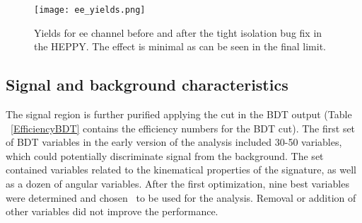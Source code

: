 




\begin{figure}[tbp]
  \begin{center}
    \texttt{[image: ee\_yields.png]}
    \caption{Yields for ee channel before and after the tight isolation bug fix in the HEPPY. The effect is minimal as can be seen in the final limit. }
    \label{fig:yields_ee}
  \end{center}
\end{figure}



\subsection{Signal and background characteristics}

The signal region is further purified applying the cut in the BDT
output (Table ~\ref{EfficiencyBDT} contains the efficiency numbers for the BDT cut). 
The first set of BDT variables in the early version of the analysis included 30-50 variables, which could potentially discriminate signal from the background. The set contained variables related to the kinematical properties of the signature, as well as a dozen of angular variables. After the first optimization, nine best variables were determined and chosen \
to be used for the analysis. Removal or addition of other variables did not improve the performance. %


